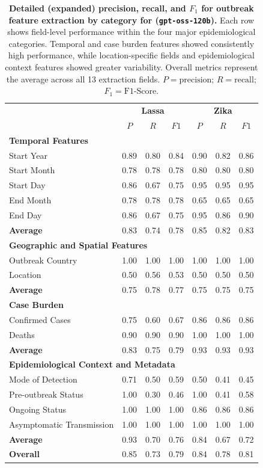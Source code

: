 \begin{table}[b!]
\centering
\caption{\textbf{Detailed (expanded) precision, recall, and $F_1$ for outbreak feature extraction by category for \name{} (\texttt{gpt-oss-120b}).} Each row shows field-level performance within the four major epidemiological categories. Temporal and case burden features showed consistently high performance, while location-specific fields and epidemiological context features showed greater variability. Overall metrics represent the average across all 13 extraction fields. $P=\text{precision}$; $R=\text{recall}$; $F_1=\text{F1-Score}$.}
\label{tab:outbreak_detailed_metrics}
\renewcommand{\arraystretch}{1}
{\footnotesize
\begin{tabular}{l|cccccc}
\toprule
 & \multicolumn{3}{c}{\textbf{Lassa}} & \multicolumn{3}{c}{\textbf{Zika}} \\
 & $P$ & $R$ & $F1$ & $P$ & $R$ & $F1$ \\
\midrule
\multicolumn{7}{l}{\textbf{Temporal Features}} \\
Start Year & 0.89 & 0.80 & 0.84 & 0.90 & 0.82 & 0.86 \\
Start Month & 0.78 & 0.78 & 0.78 & 0.80 & 0.80 & 0.80 \\
Start Day & 0.86 & 0.67 & 0.75 & 0.95 & 0.95 & 0.95 \\
End Month & 0.78 & 0.78 & 0.78 & 0.65 & 0.65 & 0.65 \\
End Day & 0.86 & 0.67 & 0.75 & 0.95 & 0.86 & 0.90 \\
\textbf{Average} & 0.83 & 0.74 & 0.78 & 0.85 & 0.82 & 0.83 \\
\midrule
\multicolumn{7}{l}{\textbf{Geographic and Spatial Features}} \\
Outbreak Country & 1.00 & 1.00 & 1.00 & 1.00 & 1.00 & 1.00 \\
Location & 0.50 & 0.56 & 0.53 & 0.50 & 0.50 & 0.50 \\
\textbf{Average} & 0.75 & 0.78 & 0.77 & 0.75 & 0.75 & 0.75 \\
\midrule
\multicolumn{7}{l}{\textbf{Case Burden}} \\
Confirmed Cases & 0.75 & 0.60 & 0.67 & 0.86 & 0.86 & 0.86 \\
Deaths & 0.90 & 0.90 & 0.90 & 1.00 & 1.00 & 1.00 \\
\textbf{Average} & 0.83 & 0.75 & 0.79 & 0.93 & 0.93 & 0.93 \\
\midrule
\multicolumn{7}{l}{\textbf{Epidemiological Context and Metadata}} \\
Mode of Detection & 0.71 & 0.50 & 0.59 & 0.50 & 0.41 & 0.45 \\
Pre-outbreak Status & 1.00 & 0.30 & 0.46 & 1.00 & 0.41 & 0.58 \\
Ongoing Status & 1.00 & 1.00 & 1.00 & 0.86 & 0.86 & 0.86 \\
Asymptomatic Transmission & 1.00 & 1.00 & 1.00 & 1.00 & 1.00 & 1.00 \\
\textbf{Average} & 0.93 & 0.70 & 0.76 & 0.84 & 0.67 & 0.72 \\
\midrule
\textbf{Overall} & 0.85 & 0.73 & 0.79 & 0.84 & 0.78 & 0.81 \\
\bottomrule
\end{tabular}
}
\end{table}


